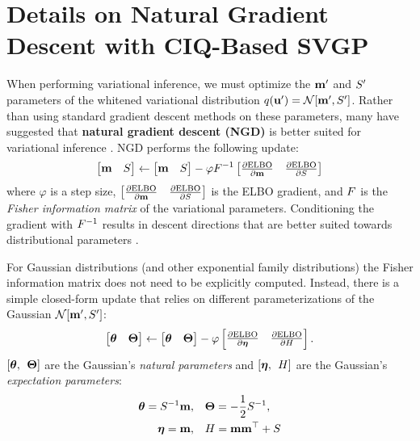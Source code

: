 \chapter{Details on Natural Gradient Descent with CIQ-Based SVGP}
\label{app:ngd}

When performing variational inference, we must optimize the $\mathbf{m}'$ and $S'$ parameters of the whitened variational distribution $q(\bu') = \normaldist{\bmm'}{\bS'}$.
Rather than using standard gradient descent methods on these parameters, many have suggested that {\bf natural gradient descent (NGD)} is better suited for variational inference \cite{hoffman2013stochastic,hensman2012fast,salimbeni2018natural}.
NGD performs the following update:
%
\begin{equation}
  \begin{bmatrix} \mathbf{m} & S \end{bmatrix} \gets \begin{bmatrix} \mathbf{m} & S \end{bmatrix} - \varphi  F^{-1}
  \begin{bmatrix} \frac{\partial \text{ELBO}}{\partial \mathbf{m}} & \frac{\partial \text{ELBO}}{\partial S} \end{bmatrix}
\end{equation}
%
where $\varphi$ is a step size, $\begin{bmatrix} \frac{\partial \text{ELBO}}{\partial \mathbf{m}} & \frac{\partial \text{ELBO}}{\partial S} \end{bmatrix}$ is the ELBO gradient, and $F$ is the \emph{Fisher information matrix} of the variational parameters.
Conditioning the gradient with $F^{-1}$ results in descent directions that are better suited towards distributional parameters \cite{hoffman2013stochastic}.

For Gaussian distributions (and other exponential family distributions) the Fisher information matrix does not need to be explicitly computed.
Instead, there is a simple closed-form update that relies on different parameterizations of the Gaussian $\normaldist{\bmm'}{\bS'}$:
%
\begin{equation}
  \begin{bmatrix} \boldsymbol{\theta} & \boldsymbol{\Theta} \end{bmatrix} \gets \begin{bmatrix} \boldsymbol{\theta} & \boldsymbol{\Theta} \end{bmatrix} - \varphi
  \begin{bmatrix} \frac{\partial \text{ELBO}}{\partial \boldsymbol{\eta}} & \frac{\partial \text{ELBO}}{\partial H} \end{bmatrix}.
\end{equation}
%
$[\boldsymbol{\theta}, \:\: \boldsymbol{\Theta}]$ are the Gaussian's \emph{natural parameters}
and $[\boldsymbol{\eta}, \:\: H]$ are the Gaussian's \emph{expectation parameters}:
%
\begin{align*}
  \boldsymbol{\theta} = S^{-1} \mathbf{m}, &\quad
  \boldsymbol{\Theta} = -\frac 1 2 S^{-1}, \\
  \boldsymbol{\eta} = \mathbf{m}, &\quad
  H = \mathbf{m} \mathbf{m}^\top + S
\end{align*}


